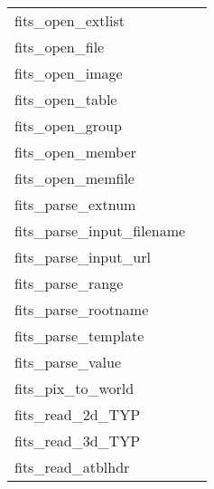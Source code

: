 \documentclass[11pt]{book}
\begin{document}
\begin{tabular}{lr}
fits\_open\_extlist      & \pageref{ffopen} \\
fits\_open\_file      & \pageref{ffopen} \\
fits\_open\_image      & \pageref{ffopen} \\
fits\_open\_table      & \pageref{ffopen} \\
fits\_open\_group    & \pageref{ffgtop} \\
fits\_open\_member    & \pageref{ffgmop} \\
fits\_open\_memfile   & \pageref{ffomem} \\
fits\_parse\_extnum   & \pageref{ffextn} \\
fits\_parse\_input\_filename & \pageref{ffiurl} \\
fits\_parse\_input\_url & \pageref{ffiurl} \\
fits\_parse\_range    & \pageref{ffrwrg} \\
fits\_parse\_rootname & \pageref{ffrtnm} \\
fits\_parse\_template & \pageref{ffgthd} \\
fits\_parse\_value    & \pageref{ffpsvc} \\
fits\_pix\_to\_world & \pageref{ffwldp} \\
fits\_read\_2d\_TYP      & \pageref{ffg2dx} \\
fits\_read\_3d\_TYP      & \pageref{ffg3dx} \\
fits\_read\_atblhdr      & \pageref{ffghtb} \\
\end{tabular}
\end{document}
